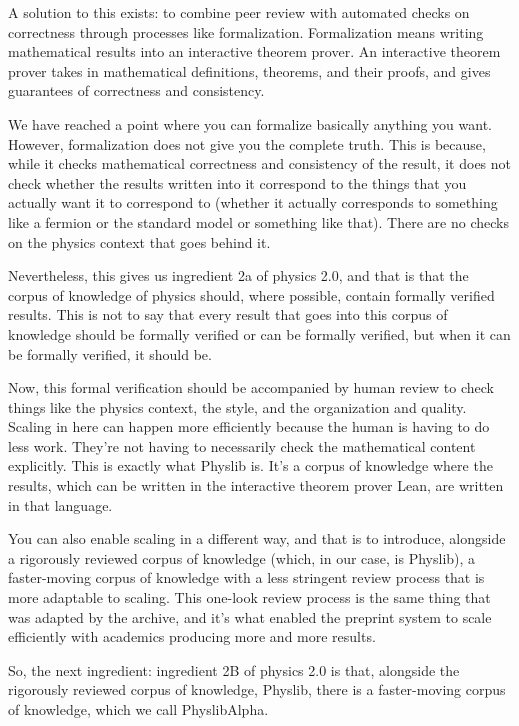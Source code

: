 \documentclass[11pt,a4paper]{article}
\begin{document}
A solution to this exists: to combine peer review with automated checks on correctness through processes like formalization. Formalization means writing mathematical results into an interactive theorem prover. An interactive theorem prover takes in mathematical definitions, theorems, and their proofs, and gives guarantees of correctness and consistency.

We have reached a point where you can formalize basically anything you want. However, formalization does not give you the complete truth. This is because, while it checks mathematical correctness and consistency of the result, it does not check whether the results written into it correspond to the things that you actually want it to correspond to (whether it actually corresponds to something like a fermion or the standard model or something like that). There are no checks on the physics context that goes behind it.

Nevertheless, this gives us ingredient 2a of physics 2.0, and that is that the corpus of knowledge of physics should, where possible, contain formally verified results. This is not to say that every result that goes into this corpus of knowledge should be formally verified or can be formally verified, but when it can be formally verified, it should be.

Now, this formal verification should be accompanied by human review to check things like the physics context, the style, and the organization and quality. Scaling in here can happen more efficiently because the human is having to do less work. They're not having to necessarily check the mathematical content explicitly. This is exactly what Physlib is. It's a corpus of knowledge where the results, which can be written in the interactive theorem prover Lean, are written in that language.

You can also enable scaling in a different way, and that is to introduce, alongside a rigorously reviewed corpus of knowledge (which, in our case, is Physlib), a faster-moving corpus of knowledge with a less stringent review process that is more adaptable to scaling. This one-look review process is the same thing that was adapted by the archive, and it's what enabled the preprint system to scale efficiently with academics producing more and more results.

So, the next ingredient: ingredient 2B of physics 2.0 is that, alongside the rigorously reviewed corpus of knowledge, Physlib, there is a faster-moving corpus of knowledge, which we call PhyslibAlpha.
\end{document}
